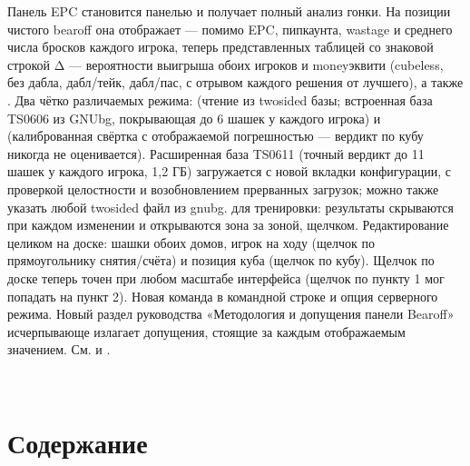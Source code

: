 \documentclass[letterpaper,10pt,russian]{sphinxmanual}
\begin{document}
\begin{savenotes}
\begin{longtable}{}
\begin{varwidth}[t]{}
Панель EPC становится панелью  и получает полный анализ гонки. На позиции чистого bearoff она отображает — помимо EPC, пипкаунта, wastage и среднего числа бросков каждого игрока, теперь представленных таблицей со знаковой строкой Δ — вероятности выигрыша обоих игроков и money\sphinxhyphen{}эквити (cubeless, без дабла, дабл/тейк, дабл/пас, с отрывом каждого решения от лучшего), а также . Два чётко различаемых режима:  (чтение из two\sphinxhyphen{}sided базы; встроенная база TS\sphinxhyphen{}06\sphinxhyphen{}06 из GNUbg, покрывающая до 6 шашек у каждого игрока) и  (калиброванная свёртка с отображаемой погрешностью — вердикт по кубу никогда не оценивается). Расширенная база TS\sphinxhyphen{}06\sphinxhyphen{}11 (точный вердикт до 11 шашек у каждого игрока, 1,2 ГБ) загружается с новой вкладки  конфигурации, с проверкой целостности и возобновлением прерванных загрузок; можно также указать любой two\sphinxhyphen{}sided файл  из gnubg.  для тренировки: результаты скрываются при каждом изменении и открываются зона за зоной, щелчком. Редактирование целиком на доске: шашки обоих домов, игрок на ходу (щелчок по прямоугольнику снятия/счёта) и позиция куба (щелчок по кубу). Щелчок по доске теперь точен при любом масштабе интерфейса (щелчок по пункту 1 мог попадать на пункт 2). Новая команда  в командной строке и опция  серверного режима. Новый раздел руководства «Методология и допущения панели Bearoff» исчерпывающе излагает допущения, стоящие за каждым отображаемым значением. См. {\hyperref[\detokenize{manuel:panneau-epc}]{}} и {\hyperref[\detokenize{manuel:epc-methodologie}]{}}.
\sphinxbeforeendvarwidth
\end{varwidth}%
\\
\sphinxbottomrule
\end{longtable}
\sphinxtableafterendhook
\sphinxatlongtableend
\end{savenotes}


\chapter{Содержание}
\label{\detokenize{index:sommaire}}
\sphinxstepscope
\end{document}
